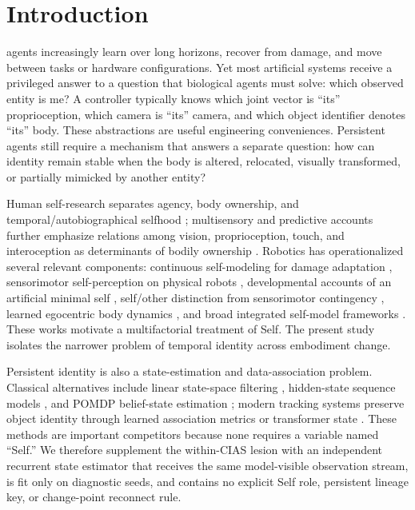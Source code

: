 \documentclass[journal]{IEEEtran}
\begin{document}
\section{Introduction}
 agents increasingly learn over long horizons, recover from damage, and move between tasks or hardware configurations. Yet most artificial systems receive a privileged answer to a question that biological agents must solve: which observed entity is me? A controller typically knows which joint vector is ``its'' proprioception, which camera is ``its'' camera, and which object identifier denotes ``its'' body. These abstractions are useful engineering conveniences. Persistent agents still require a mechanism that answers a separate question: how can identity remain stable when the body is altered, relocated, visually transformed, or partially mimicked by another entity?

Human self-research separates agency, body ownership, and temporal/autobiographical selfhood \cite{Gallagher2000,Braun2018,Blanke2015,Conway2000}; multisensory and predictive accounts further emphasize relations among vision, proprioception, touch, and interoception as determinants of bodily ownership \cite{Botvinick1998,Tsakiris2010,Seth2013,Apps2014}. Robotics has operationalized several relevant components: continuous self-modeling for damage adaptation \cite{Bongard2006}, sensorimotor self-perception on physical robots \cite{Lanillos2017,Oliver2022}, developmental accounts of an artificial minimal self \cite{Hafner2020,Forch2021}, self/other distinction from sensorimotor contingency \cite{Lanillos2020,Chen2026}, learned egocentric body dynamics \cite{Hu2025}, and broad integrated self-model frameworks \cite{Jiang2026}. These works motivate a multifactorial treatment of Self. The present study isolates the narrower problem of temporal identity across embodiment change.

Persistent identity is also a state-estimation and data-association problem. Classical alternatives include linear state-space filtering \cite{Kalman1960}, hidden-state sequence models \cite{Rabiner1989}, and POMDP belief-state estimation \cite{Kaelbling1998}; modern tracking systems preserve object identity through learned association metrics or transformer state \cite{Wojke2017,Luo2021,Meinhardt2022}. These methods are important competitors because none requires a variable named ``Self.'' We therefore supplement the within-CIAS lesion with an independent recurrent state estimator that receives the same model-visible observation stream, is fit only on diagnostic seeds, and contains no explicit Self role, persistent lineage key, or change-point reconnect rule.
\end{document}

